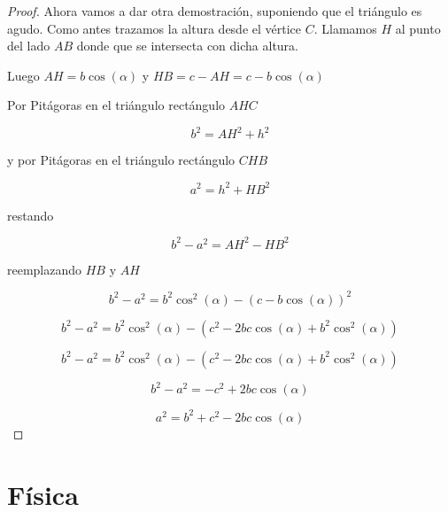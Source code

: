 \begin{proof}
Ahora vamos a dar otra demostración, suponiendo que el triángulo es agudo.  Como antes trazamos la altura desde el vértice $C$.  Llamamos $H$ al punto del lado $AB$ donde que se intersecta con dicha altura.

Luego $AH = b \cos(\alpha) $ y $HB = c - AH = c - b \cos(\alpha)$

Por Pitágoras en el triángulo rectángulo $AHC$

$$ b^2 = AH^2 + h^2 $$

y por Pitágoras en el triángulo rectángulo $CHB$

$$ a^2 = h^2 + HB^2 $$

restando

$$b^2 - a^2 = AH^2 - HB^2 $$

reemplazando $HB$ y $AH$

$$b^2 - a^2 = b^2 \cos^2(\alpha) - (c - b \cos(\alpha))^2 $$

$$b^2 - a^2 = b^2 \cos^2(\alpha) - (c^2 - 2bc \cos(\alpha) + b^2 \cos^2(\alpha)) $$

$$b^2 - a^2 = b^2 \cos^2(\alpha) - (c^2 - 2bc \cos(\alpha) + b^2 \cos^2(\alpha)) $$

$$b^2 - a^2 = - c^2 + 2bc \cos(\alpha) $$

$$ a^2 = b^2 + c^2 - 2bc \cos(\alpha) $$
\end{proof}



\chapter{Física}

